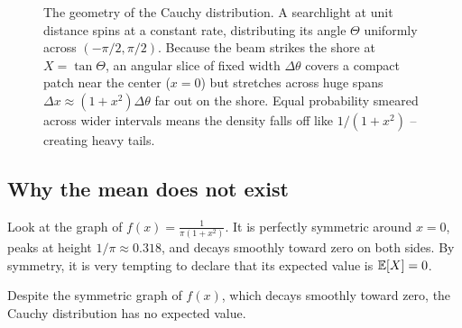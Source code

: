 \begin{figure}[H]
\caption{The geometry of the Cauchy distribution. A searchlight at unit distance spins at a constant rate, distributing its angle $\Theta$ uniformly across $(-\pi/2, \pi/2)$. Because the beam strikes the shore at $X = \tan\Theta$, an angular slice of fixed width $\Delta\theta$ covers a compact patch near the center ($x=0$) but stretches across huge spans $\Delta x \approx (1+x^2)\Delta\theta$ far out on the shore. Equal probability smeared across wider intervals means the density falls off like $1/(1+x^2)$ -- creating heavy tails.}
\label{ch11:fig-cauchy}
\end{figure}

\subsection{Why the mean does not exist}

Look at the graph of $f(x) = \frac{1}{\pi(1+x^2)}$. It is perfectly symmetric around
$x=0$, peaks at height $1/\pi \approx 0.318$, and decays smoothly toward zero on
both sides. By symmetry, it is very tempting to declare that its expected value
is $\operatorname{\mathbb{E}}[X] = 0$.

Despite the symmetric graph of $f(x)$, which decays smoothly toward zero, the Cauchy distribution has no expected value.

